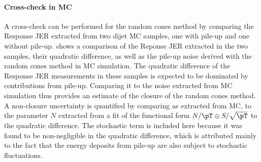 






\paragraph{Cross-check in MC} A cross-check can be performed for the random cones method by comparing the Response JER extracted from two dijet MC samples, one with pile-up and one without pile-up.  shows a comparison of the Reponse JER extracted in the two samples, their quadratic difference, as well as the pile-up noise derived with the random cones method in MC simulation. 
The quadratic difference of the Response JER measurements in these samples is expected to be dominated by contributions from pile-up.
Comparing it to the noise extracted from MC simulation thus provides an estimate of the closure of the random cones method.
A non-closure uncertainty is quantified by comparing \Npileup as extracted from MC, to the parameter $N$ extracted from a fit of the functional form $N/\pT \oplus S/\sqrt{\pT}$ to the quadratic difference. The stochastic term is included here because it was found to be non-negligible in the quadratic difference, which is attributed mainly to the fact that the energy deposits from pile-up are also subject to stochastic fluctuations.

